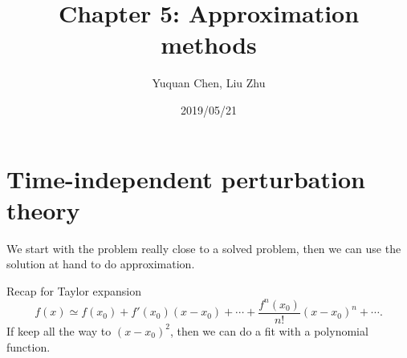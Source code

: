 \documentclass[UTF8,12pt]{article} %
\begin{document}
\title{Chapter 5: Approximation methods}
\author{Yuquan Chen, Liu Zhu}
\date{2019/05/21} %
\maketitle

\section{Time-independent perturbation theory}

We start with the problem really close to a solved problem, then we can use the solution at hand to do approximation. \\

\begin{myboxes}{Recap for Taylor expansion}{}
\begin{equation}
   f(x)\simeq f(x_0)+f'(x_0)(x-x_0)+\cdots+\frac{f^n(x_0)}{n!}(x-x_0)^n+\cdots . 
\end{equation}
If keep all the way to $(x-x_0)^2$, then we can do a fit with a polynomial function.
\end{myboxes}
\end{document}
